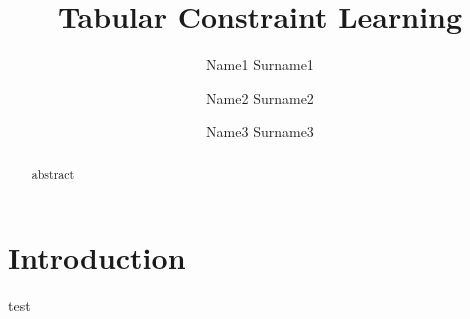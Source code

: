 \documentclass{ecai}
\begin{document}
\title{Tabular Constraint Learning}

\author{Name1 Surname1 \and Name2 Surname2 \and Name3 Surname3 }

\maketitle


\begin{abstract}
  abstract
  \end{abstract}
\section{Introduction}
test
\end{document}
